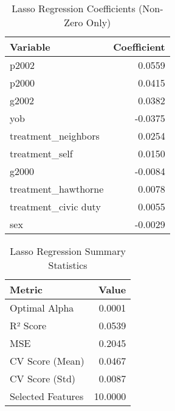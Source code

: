 \begin{table}
\caption{Lasso Regression Coefficients (Non-Zero Only)}
\label{tab:lasso_coefficients}
\begin{tabular}{lr}
\toprule
Variable & Coefficient \\
\midrule
p2002 & 0.0559 \\
p2000 & 0.0415 \\
g2002 & 0.0382 \\
yob & -0.0375 \\
treatment_neighbors & 0.0254 \\
treatment_self & 0.0150 \\
g2000 & -0.0084 \\
treatment_hawthorne & 0.0078 \\
treatment_civic duty & 0.0055 \\
sex & -0.0029 \\
\bottomrule
\end{tabular}
\end{table}


\begin{table}
\caption{Lasso Regression Summary Statistics}
\label{tab:lasso_summary}
\begin{tabular}{lr}
\toprule
Metric & Value \\
\midrule
Optimal Alpha & 0.0001 \\
R² Score & 0.0539 \\
MSE & 0.2045 \\
CV Score (Mean) & 0.0467 \\
CV Score (Std) & 0.0087 \\
Selected Features & 10.0000 \\
\bottomrule
\end{tabular}
\end{table}
